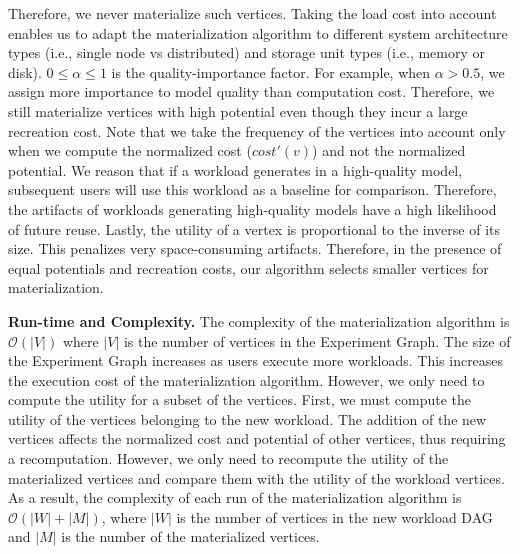 Therefore, we never materialize such vertices.
Taking the load cost into account enables us to adapt the materialization algorithm to different system architecture types (i.e., single node vs distributed) and storage unit types (i.e., memory or disk).
$0 \leq \alpha \leq 1$ is the quality-importance factor.
For example, when $\alpha > 0.5$, we assign more importance to model quality than computation cost.
Therefore, we still materialize vertices with high potential even though they incur a large recreation cost.
Note that we take the frequency of the vertices into account only when we compute the normalized cost ($cost'(v)$) and not the normalized potential.
We reason that if a workload generates in a high-quality model, subsequent users will use this workload as a baseline for comparison.
Therefore, the artifacts of workloads generating high-quality models have a high likelihood of future reuse.
Lastly, the utility of a vertex is proportional to the inverse of its size.
This penalizes very space-consuming artifacts.
Therefore, in the presence of equal potentials and recreation costs, our algorithm selects smaller vertices for materialization.

\textbf{Run-time and Complexity.}
The complexity of the materialization algorithm is $\mathcal{O}(|V|)$ where $|V|$ is the number of vertices in the Experiment Graph.
The size of the Experiment Graph increases as users execute more workloads.
This increases the execution cost of the materialization algorithm.
However, we only need to compute the utility for a subset of the vertices. 
First, we must compute the utility of the vertices belonging to the new workload.
The addition of the new vertices affects the normalized cost and potential of other vertices, thus requiring a recomputation.
However, we only need to recompute the utility of the materialized vertices and compare them with the utility of the workload vertices.
As a result, the complexity of each run of the materialization algorithm is $\mathcal{O}(|W| + |M|)$, where $|W|$ is the number of vertices in the new workload DAG and $|M|$ is the number of the materialized vertices.

